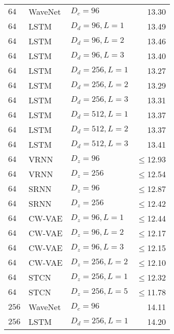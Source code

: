 {\begin{table}[p]
\begin{tabular}{lll|r}
        $64$      & WaveNet             & $D_c=96$              & 13.30 \\
        $64$      & LSTM                & $D_d=96, L=1$         & 13.49 \\
        $64$      & LSTM                & $D_d=96, L=2$         & 13.46 \\
        $64$      & LSTM                & $D_d=96, L=3$         & 13.40 \\
        $64$      & LSTM                & $D_d=256, L=1$        & 13.27 \\
        $64$      & LSTM                & $D_d=256, L=2$        & 13.29 \\
        $64$      & LSTM                & $D_d=256, L=3$        & 13.31 \\
        $64$      & LSTM                & $D_d=512, L=1$        & 13.37 \\
        $64$      & LSTM                & $D_d=512, L=2$        & 13.37 \\
        $64$      & LSTM                & $D_d=512, L=3$        & 13.41 \\
        $64$      & VRNN                & $D_z=96$              & $\leq$12.93 \\
        $64$      & VRNN                & $D_z=256$             & $\leq$12.54 \\
        $64$      & SRNN                & $D_z=96$              & $\leq$12.87 \\
        $64$      & SRNN                & $D_z=256$             & $\leq$12.42 \\
        $64$      & CW-VAE              & $D_z=96, L=1$         & $\leq$12.44 \\
        $64$      & CW-VAE              & $D_z=96, L=2$         & $\leq$12.17 \\
        $64$      & CW-VAE              & $D_z=96, L=3$         & $\leq$12.15 \\
        $64$      & CW-VAE              & $D_z=256, L=2$        & $\leq$12.10 \\
        $64$ & STCN               & $D_z=256,L=1$               & $\leq$12.32 \\  %
        $64$ & STCN               & $D_z=256,L=5$               & $\leq$11.78 \\
        \midrule
        $256$     & WaveNet             & $D_c=96$              & 14.11 \\
        $256$     & LSTM                & $D_d=256, L=1$        & 14.20 \\

\end{tabular}
\end{table}}
